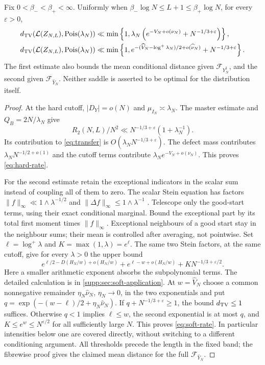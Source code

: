 \begin{theorem}\label{thm:scalar-rates}
Fix $0<\beta_-<\beta_+<\infty$. Uniformly when
$\beta_-\log N\le L+1\le\beta_+\log N$, for every $\varepsilon>0$,
\begin{align}
 d_{\mathrm{TV}}(\mathcal L(Z_{N,L}),\operatorname{Pois}(\lambda_N))
 &\ll\min\left\{1,\lambda_N
       \left(e^{-V_N+o(\nu_N)}+N^{-1/3+\varepsilon}\right)\right\},
       \label{eq:hard-rate}\\
 d_{\mathrm{TV}}(\mathcal L(Z_{N,L}),\operatorname{Pois}(\lambda_N))
 &\ll\min\left\{1,
       e^{-(\widehat V_N-\log^+\lambda_N)/2+o(\widehat\nu_N)}
                   +N^{-1/3+\varepsilon}\right\}.
       \label{eq:soft-rate}
\end{align}
The first estimate also bounds the mean conditional distance given
$\mathcal F_{Y_N^\sharp}$, and the second given
$\mathcal F_{\widehat Y_N}$. Neither saddle is asserted to be optimal for
the distribution itself.
\end{theorem}
\begin{proof}
At the hard cutoff, $|D_Y|=o(N)$ and $\mu_{I_N}\asymp\lambda_N$.
The master estimate and $Q_B=2N/\lambda_N$ give
\[
 R_2(N,L)/N^2\ll N^{-1/3+\varepsilon}(1+\lambda_N^{-1}).
\]
Its contribution to \eqref{eq:transfer} is
$O(\lambda_NN^{-1/3+\varepsilon})$. The defect mass contributes
$\lambda_NN^{-1/2+o(1)}$ and the cutoff terms contribute
$\lambda_Ne^{-V_N+o(\nu_N)}$. This proves \eqref{eq:hard-rate}.

For the second estimate retain the exceptional indicators in the scalar
sum instead of coupling all of them to zero. The scalar Stein equation
has factors $\|f\|_\infty\ll1\wedge\lambda^{-1/2}$ and
$\|\Delta f\|_\infty\le1\wedge\lambda^{-1}$
\cite{Krokowski2017,Rollin2012SteinFactors}.
Telescope only the good-start terms, using their exact conditional
marginal. Bound the exceptional part by its total first moment times
$\|f\|_\infty$. Exceptional neighbours of a good start stay in the
neighbour sums; their mean is controlled after averaging, not pointwise.
Set $\ell=\log^+\lambda$ and $K=\max(1,\lambda)=e^\ell$.
The same two Stein factors, at the same cutoff, give for every $\lambda>0$
the upper bound
\begin{equation}\label{eq:soft-free-rate}
 e^{\ell/2-D(H_N/w)+o(H_N/w)}
 +e^{\ell-w+o(H_N/w)}+K N^{-1/3+\varepsilon/2}.
\end{equation}
Here a smaller arithmetic exponent absorbs the subpolynomial terms.
The detailed calculation is in \cref{supp:sec:soft-application}.
At $w=\widehat V_N$ choose a common nonnegative remainder
$\eta_N\widehat\nu_N$, $\eta_N\to0$, in the two exponentials and put
$q=\exp(-(w-\ell)/2+\eta_N\widehat\nu_N)$.
If $q+N^{-1/3+\varepsilon}\ge1$, the bound $d_{\mathrm{TV}}\le1$ suffices.
Otherwise $q<1$ implies $\ell\le w$, the second exponential is at most
$q$, and $K\le e^w\le N^{\varepsilon/2}$ for all sufficiently large $N$.
This proves \eqref{eq:soft-rate}. In particular intensities below one
are covered directly, without switching to a different conditioning
argument. All thresholds precede the length in the fixed band; the
fibrewise proof gives the claimed mean distance for the full
$\mathcal F_{\widehat Y_N}$.
\end{proof}
